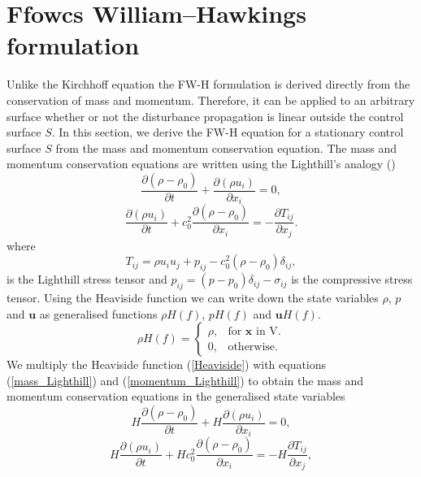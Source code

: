 \documentclass[a4paper]{article}
\begin{document}
\section{Ffowcs William–Hawkings formulation}
Unlike the Kirchhoff equation the FW-H formulation is derived directly from the conservation of mass and
momentum. Therefore, it can be applied to an arbitrary surface whether or not the
disturbance propagation is linear outside the control surface $S$.
In this section, we derive the FW-H equation for a stationary control surface $S$ from the mass and momentum conservation equation.
The mass and momentum conservation equations are written using the Lighthill’s analogy
(\cite{lighthill1952sound})
\begin{equation}\label{mass_Lighthill}
	\frac{\partial (\rho - \rho_{0})}{\partial t} + \frac{\partial (\rho u_{i})}{\partial x_{i}} = 0,
\end{equation}
\begin{equation}\label{momentum_Lighthill}
	\frac{\partial (\rho u_{i})}{\partial t} + c_{0}^{2}\frac{\partial (\rho - \rho_{0})}{\partial x_{i}} = - \frac{\partial T_{ij}}{\partial x_{j}}.
\end{equation}
where
\begin{equation}\label {Lighthill_Tensor}
	T_{ij} = \rho u_{i}u_{j} + p_{ij} - c_{0}^{2}(\rho - \rho_{0})\delta_{ij},
\end{equation}
is the Lighthill stress tensor and $p_{ij} = (p - p_{0})\delta_{ij} - \sigma_{ij}$ is the compressive stress tensor.
Using the Heaviside function we can write down the state variables $\rho$, $p$ and $\mathbf{u}$ as generalised functions $\rho H(f)$, $pH(f)$ and $\mathbf{u}H(f)$.
\begin{equation}\label{Generalized_Functions2}
	\rho H(f) =\begin{cases}
		\rho , & \text{for $\mathbf{x}$ in V}. \\
		0,     & \text{otherwise}.
	\end{cases}
\end{equation}
We multiply the Heaviside function (\ref{Heaviside}) with equations (\ref{mass_Lighthill}) and (\ref{momentum_Lighthill}) to obtain the mass and momentum conservation equations in the generalised state variables
\begin{equation}
	H\frac{\partial (\rho - \rho_{0})}{\partial t} + H\frac{\partial (\rho u_{i})}{\partial x_{i}} = 0,
\end{equation}
\begin{equation}
	H\frac{\partial (\rho u_{i})}{\partial t} + Hc_{0}^{2}\frac{\partial (\rho - \rho_{0})}{\partial x_{i}} = - H\frac{\partial T_{ij}}{\partial x_{j}},
\end{equation}
\end{document}
